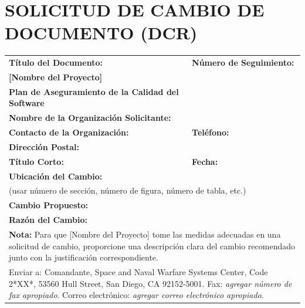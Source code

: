 ﻿\newpage
\section*{SOLICITUD DE CAMBIO DE DOCUMENTO (DCR)}

\begin{table}[H]
\begin{tabular}{|p{8cm}|p{6cm}|}
\hline
\textbf{Título del Documento:} & \textbf{Número de Seguimiento:} \\
\textbf{[Nombre del Proyecto]} & \\
\textbf{Plan de Aseguramiento de la Calidad del Software} & \\
\hline
\multicolumn{2}{|p{14cm}|}{\textbf{Nombre de la Organización Solicitante:}} \\
\hline
\textbf{Contacto de la Organización:} & \textbf{Teléfono:} \\
\hline
\multicolumn{2}{|p{14cm}|}{\textbf{Dirección Postal:}} \\
\hline
\textbf{Título Corto:} & \textbf{Fecha:} \\
\hline
\multicolumn{2}{|p{14cm}|}{\textbf{Ubicación del Cambio:}} \\
\multicolumn{2}{|p{14cm}|}{(usar número de sección, número de figura, número de tabla, etc.)} \\
\hline
\multicolumn{2}{|p{14cm}|}{\textbf{Cambio Propuesto:}} \\
\hline
\multicolumn{2}{|p{14cm}|}{\textbf{Razón del Cambio:}} \\
\hline
\multicolumn{2}{|p{14cm}|}{\textbf{Nota:} Para que [Nombre del Proyecto] tome las medidas adecuadas en una solicitud de cambio, proporcione una descripción clara del cambio recomendado junto con la justificación correspondiente.} \\
\multicolumn{2}{|p{14cm}|}{Enviar a: Comandante, Space and Naval Warfare Systems Center, Code 2*XX*, 53560 Hull Street, San Diego, CA 92152-5001. Fax: \textit{agregar número de fax apropiado}. Correo electrónico: \textit{agregar correo electrónico apropiado}.} \\
\hline
\end{tabular}
\end{table}


